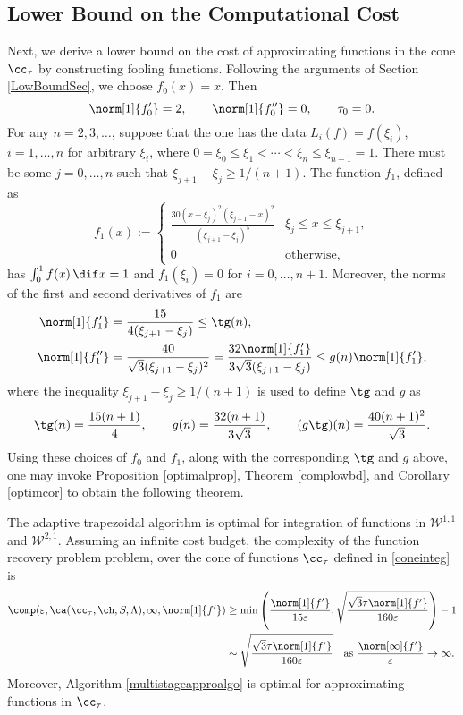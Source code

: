 \subsection{Lower Bound on the Computational Cost}
Next, we derive a lower bound on the cost of approximating functions in the cone $\cc_{\tau}$ by constructing fooling functions. Following the arguments of Section \ref{LowBoundSec}, we choose  $f_0(x)=x.$ Then
\[
\norm[1]{f'_0}=2, \qquad \norm[1]{f''_0}=0, \qquad \tau_0=0.
\]
For any $n =2, 3, \ldots$, suppose that the one has the data $L_i(f)=f(\xi_i)$, $i=1, \ldots, n$ for arbitrary $\xi_i$, where $0=\xi_0 \le \xi_1 < \cdots < \xi_n \le \xi_{n+1} = 1$.  There must be some $j=0, \ldots, n$ such that $\xi_{j+1} - \xi_j \ge 1/(n+1)$.  The function $f_{1}$, defined as
$$
f_{1}(x):=\begin{cases} \displaystyle
\frac{30(x-\xi_{j})^{2}(\xi_{j+1}-x)^{2}}{(\xi_{j+1}-\xi_{j})^5} & \xi_{j} \le x \leq \xi_{j+1},\\
0 & \text{otherwise},
\end{cases}
$$
has $\int_0^1 f(x) \, \dif x=1$ and $f_1(\xi_i)=0$ for $i=0, \ldots, n+1$.  Moreover, the norms of the first and second derivatives of $f_1$ are
\begin{align*}
\norm[1]{f'_1}&=\frac{15}{4(\xi_{j+1}-\xi_{j})}\leq \tg(n),\\
\norm[1]{f''_1}&=\frac{40}{\sqrt{3}(\xi_{j+1}-\xi_{j})^2}
=\frac{32\norm[1]{f'_1}}{3\sqrt{3}(\xi_{j+1}-\xi_{j})}
 \leq g(n) \norm[1]{f'_1},
\end{align*}
where the inequality $\xi_{j+1} - \xi_j \ge 1/(n+1)$ is used to define $\tg$ and $g$ as
\[
\tg(n) = \frac{15(n+1)}{4}, \qquad g(n) = \frac{32(n+1)}{3\sqrt{3}}, \qquad (g\tg)(n) = \frac{40(n+1)^2}{\sqrt{3}}.
\]
Using these choices of $f_0$ and $f_1$, along with the corresponding $\tg$ and $g$ above, one may invoke Proposition \ref{optimalprop}, Theorem \ref{complowbd}, and Corollary \ref{optimcor} to obtain the following theorem.

\begin{theorem} \label{complowbdinteg} The adaptive trapezoidal algorithm is optimal for integration of functions in $\mathcal{W}^{1,1}$ and $\mathcal{W}^{2,1}$. Assuming an infinite cost budget, the complexity of the function recovery problem problem, over the cone of functions $\cc_{\tau}$ defined in \eqref{coneinteg} is
\begin{align*}
\comp(\varepsilon,\ca(\cc_{\tau},\ch,S,\Lambda),\infty,\norm[1]{f'})
&\ge \min\left(\frac{\norm[1]{f'}}{15 \varepsilon}, \sqrt{\frac{\sqrt{3}\tau\norm[1]{f'}}{160\varepsilon}} \right)-1\\
& \sim \sqrt{\frac{\sqrt{3}\tau\norm[1]{f'}}{160\varepsilon}}  \quad\text{as } \frac{\norm[\infty]{f'}}{\varepsilon} \to \infty.
\end{align*}
Moreover, Algorithm \ref{multistageapproalgo} is optimal for approximating functions in $\cc_{\tau}$.
\end{theorem}

